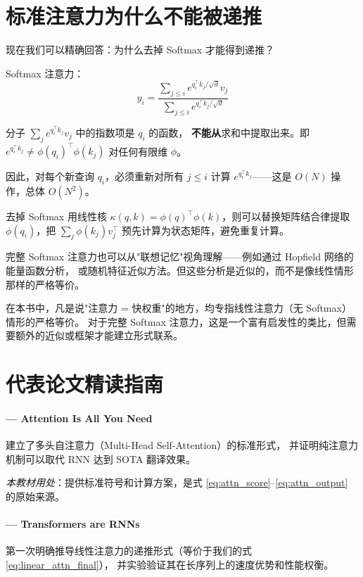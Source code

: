 \section{标准注意力为什么不能被递推}
\label{sec:softmax_no_recurrence}

现在我们可以精确回答：为什么去掉 Softmax 才能得到递推？

Softmax 注意力：
\begin{equation}
  y_i = \frac{\sum_{j \le i} e^{q_i^\top k_j / \sqrt{d}} v_j}{\sum_{j \le i} e^{q_i^\top k_j / \sqrt{d}}}
  \label{eq:softmax_expanded}
\end{equation}

分子 $\sum_j e^{q_i^\top k_j} v_j$ 中的指数项是 $q_i$ 的函数，
\textbf{不能从}求和中提取出来。即 $e^{q_i^\top k_j} \ne \phi(q_i)^\top \phi(k_j)$
对任何有限维 $\phi$。

因此，对每个新查询 $q_i$，必须重新对所有 $j \le i$ 计算 $e^{q_i^\top k_j}$——这是 $O(N)$ 操作，总体 $O(N^2)$。

去掉 Softmax 用线性核 $\kappa(q, k) = \phi(q)^\top \phi(k)$，则可以替换矩阵结合律提取 $\phi(q_i)$，把 $\sum_j \phi(k_j) v_j^\top$ 预先计算为状态矩阵，避免重复计算。

\begin{viewpointbox}
完整 Softmax 注意力也可以从"联想记忆"视角理解——例如通过 Hopfield 网络的能量函数分析，
或随机特征近似方法。但这些分析是近似的，而不是像线性情形那样的严格等价。

在本书中，凡是说"注意力 = 快权重"的地方，均专指线性注意力（无 Softmax）情形的严格等价。
对于完整 Softmax 注意力，这是一个富有启发性的类比，但需要额外的近似或框架才能建立形式联系。
\end{viewpointbox}

\section{代表论文精读指南}
\label{sec:attn_papers}

\paragraph{\citet{vaswani2017attention} — Attention Is All You Need}
建立了多头自注意力（Multi-Head Self-Attention）的标准形式，
并证明纯注意力机制可以取代 RNN 达到 SOTA 翻译效果。

\textit{本教材用处}：提供标准符号和计算方案，是式 \eqref{eq:attn_score}--\eqref{eq:attn_output} 的原始来源。

\paragraph{\citet{katharopoulos2020rnn} — Transformers are RNNs}
第一次明确推导线性注意力的递推形式（等价于我们的式 \eqref{eq:linear_attn_final}），
并实验验证其在长序列上的速度优势和性能权衡。

